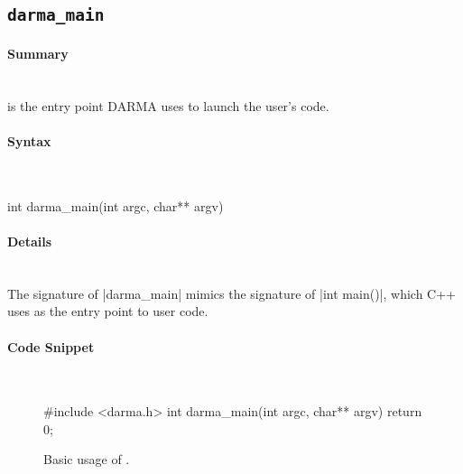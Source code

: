 


\subsection{\texttt{darma\_main}}

\paragraph{Summary}\mbox{}\\
is the entry point DARMA uses to launch the user's code.

\paragraph{Syntax}\mbox{}\\
\begin{CppCode}
int darma_main(int argc, char** argv)
\end{CppCode}

\paragraph{Details}\mbox{}\\
The signature of |darma_main| mimics the signature of |int main()|, which C++
uses as the entry point to user code.

\paragraph{Code Snippet}\mbox{}\\ 
\begin{figure}[!h]
\begin{CppCodeNumb}
#include <darma.h>
int darma_main(int argc, char** argv)
{
  return 0;
}
\end{CppCodeNumb}
\label{fig:fe_api_main}
  \caption{Basic usage of \protect{}.}
\end{figure}


